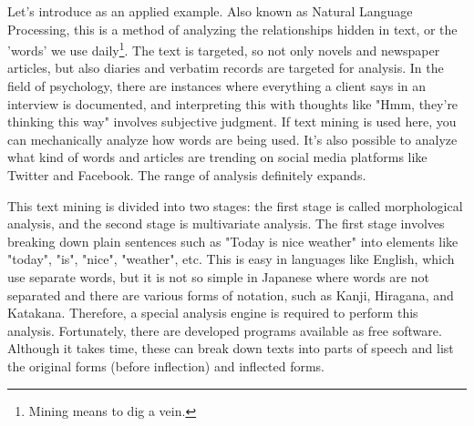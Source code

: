 \documentclass{ltjsbook}
\begin{document}
Let's introduce  as an applied example. Also known as Natural Language Processing, this is a method of analyzing the relationships hidden in text, or the 'words' we use daily\footnote{Mining means to dig a vein.}.
The text is targeted, so not only novels and newspaper articles, but also diaries and verbatim records are targeted for analysis. In the field of psychology, there are instances where everything a client says in an interview is documented, and interpreting this with thoughts like "Hmm, they're thinking this way" involves subjective judgment. If text mining is used here, you can mechanically analyze how words are being used. It's also possible to analyze what kind of words and articles are trending on social media platforms like Twitter and Facebook. The range of analysis definitely expands.

This text mining is divided into two stages: the first stage is called morphological analysis, and the second stage is multivariate analysis. The first stage involves breaking down plain sentences such as "Today is nice weather" into elements like "today", "is", "nice", "weather", etc. This is easy in languages like English, which use separate words, but it is not so simple in Japanese where words are not separated and there are various forms of notation, such as Kanji, Hiragana, and Katakana. Therefore, a special analysis engine is required to perform this analysis. Fortunately, there are developed programs available as free software. Although it takes time, these can break down texts into parts of speech and list the original forms (before inflection) and inflected forms.
\end{document}
